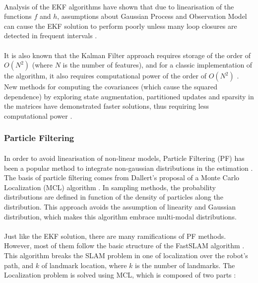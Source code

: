 \documentclass[12pt]{article}
\begin{document}
	\paragraph{}	
	 Analysis of the EKF algorithms have shown that due to linearisation of the functions $f$ and $h$, assumptions about Gaussian Process and Observation Model can cause the EKF solution to perform poorly unless many loop closures are detected in frequent intervals \cite{doi:10.1177/1729881416669482}.


	\paragraph{}
	It is also known that the Kalman Filter approach requires storage of the order of $O(N^2)$ (where $N$ is the number of features), and for a classic implementation of the algorithm, it also requires computational power of the order of $O(N^2)$ \cite{CsorbaThesis}. New methods for computing the covariances (which cause the squared dependence) by exploring state augmentation, partitioned updates and sparsity in the matrices have demonstrated faster solutions, thus requiring less computational power \cite{SLAMPartII}.

	\subsubsection{Particle Filtering}
	\paragraph{} 
	In order to avoid linearisation of non-linear models, Particle Filtering (PF) has been a popular method to integrate non-gaussian distributions in the estimation \cite{Montemerlo02fastslam:a}\cite{772544}. The basis of particle filtering comes from Dallert's proposal of a Monte Carlo Localization (MCL) algorithm \cite{772544}. In sampling methods, the probability distributions are defined in function of the density of particles along the distribution. This approach avoids the assumption of linearity and Gaussian distribution, which makes this algorithm embrace multi-modal distributions.
	
	\paragraph{}
	Just like the EKF solution, there are many ramifications of PF methods. However, most of them follow the basic structure of the FastSLAM algorithm \cite{Montemerlo02fastslam:a}. This algorithm breaks the SLAM problem in one of localization over the robot's path, and $k$ of landmark location, where $k$ is the number of landmarks. The Localization problem is solved using MCL, which is composed of two parts \cite{772544}:
	 
\end{document}
